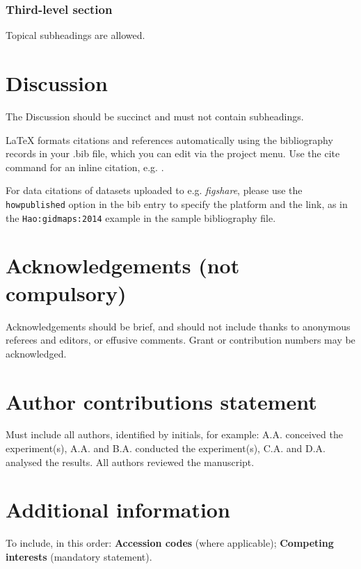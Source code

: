 \documentclass[fleqn,10pt]{wlscirep}
\begin{document}
\subsubsection*{Third-level section}

Topical subheadings are allowed.

\section*{Discussion}

The Discussion should be succinct and must not contain subheadings.
 



\noindent LaTeX formats citations and references automatically using the bibliography records in your .bib file, which you can edit via the project menu. Use the cite command for an inline citation, e.g.  \cite{Hao:gidmaps:2014}.

For data citations of datasets uploaded to e.g. \emph{figshare}, please use the \verb|howpublished| option in the bib entry to specify the platform and the link, as in the \verb|Hao:gidmaps:2014| example in the sample bibliography file.

\section*{Acknowledgements (not compulsory)}

Acknowledgements should be brief, and should not include thanks to anonymous referees and editors, or effusive comments. Grant or contribution numbers may be acknowledged.

\section*{Author contributions statement}

Must include all authors, identified by initials, for example:
A.A. conceived the experiment(s),  A.A. and B.A. conducted the experiment(s), C.A. and D.A. analysed the results.  All authors reviewed the manuscript. 

\section*{Additional information}

To include, in this order: \textbf{Accession codes} (where applicable); \textbf{Competing interests} (mandatory statement). 
\end{document}
